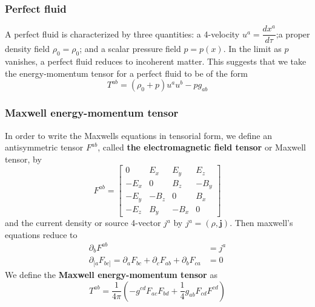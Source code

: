 \documentclass[12pt,a4paper]{article}
\numberwithin{table}{section}
\numberwithin{figure}{section}
\numberwithin{equation}{section}
\theoremstyle{remark}
\theoremstyle{definition}
\begin{document}
\subsubsection{Perfect fluid}
A perfect fluid is characterized by three quantities: a 4-velocity $u^a=\dfrac{dx^a}{d\tau}$;a proper density field $\rho_0 = \rho_0$; and a scalar pressure field $p = p(x)$. In the
limit as $p$ vanishes, a perfect fluid reduces to incoherent matter. This suggests that we take the energy-momentum tensor for a perfect fluid to be of the form
\begin{equation}
    T^{ab}=(\rho_0+p)u^au^b-pg_{ab}
\end{equation}



\subsubsection{Maxwell energy-momentum tensor}
In order to write the Maxwells equations in tensorial form, we define an  
antisymmetric tensor $F^{ab}$, called \textbf{the electromagnetic field tensor} or Maxwell tensor, by
\begin{equation}
F^{ab}=  \begin{bmatrix}
0 & E_x & E_y & E_z\\
-E_x & 0 & B_z & -B_y\\
-E_y & -B_z & 0 & B_x\\
-E_z & B_y & -B_x & 0
\end{bmatrix}
\end{equation}
and the current density or source 4-vector $j^a$ by $j^a=(\rho,\textbf{j})$. Then maxwell's equations reduce to
\begin{align}
    \partial_b F^{ab}&=j^a\\
   \partial_{[a} F_{bc]} =\partial_a F_{bc}+\partial_c F_{ab}+\partial_b F_{ca}&=0
\end{align}
We define the \textbf{Maxwell energy-momentum tensor} as
\begin{equation}
    T^{ab}=\frac{1}{4\pi}(-g^{cd}F_{ac}F_{bd}+\frac{1}{4}g_{ab}F_{cd}F^{cd})
\end{equation}
\end{document}
